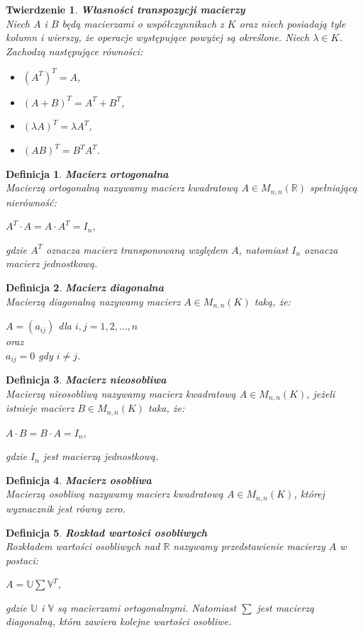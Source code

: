 \documentclass[12pt,a4paper]{report}
\newtheorem{df}{Definicja}
\newtheorem{tw}{Twierdzenie}
\begin{document}
\begin{tw}\textbf{Własności transpozycji macierzy}
\\Niech $A$ i $B$ będą macierzami o współczynnikach z $K$ oraz niech posiadają tyle kolumn i wierszy, że operacje występujące powyżej są określone. Niech $\lambda \in K$.
\\Zachodzą następujące równości:
\begin{itemize}
\item $(A^T)^T = A$,
\item $(A + B)^T = A^T + B^T$,
\item $(\lambda A)^T = \lambda A^T$,
\item $(AB)^T = B^T A^T$.
\end{itemize}
\end{tw}
\begin{df}\textbf{Macierz ortogonalna}
\\Macierzą ortogonalną nazywamy macierz kwadratową $A \in M_{n,n}(\mathbb{R})$ spełniającą nierówność:
\begin{center}
$A^T \cdot A = A\cdot A^T = I_n$,
\end{center}
gdzie $A^T$ oznacza macierz transponowaną względem $A$, natomiast $I_n$ oznacza macierz jednostkową.
\end{df}

\begin{df}\textbf{Macierz diagonalna}
\\Macierzą diagonalną nazywamy macierz $A\in M_{n,n}(K)$ taką, że:
\begin{center}
$A = (a_{ij})$ dla $i,j=1,2,...,n$ 
\\oraz 
\\$a_{ij} = 0$ gdy $i\neq j$.
\end{center}
\end{df}

\begin{df}\textbf{Macierz nieosobliwa}
\\Macierzą nieosobliwą nazywamy macierz kwadratową $A \in M_{n,n}(K)$, jeżeli istnieje macierz $B \in M_{n,n}(K)$ taka, że:
\begin{center}
$A \cdot B = B \cdot A = I_n$,
\end{center}
gdzie $I_n$ jest macierzą jednostkową.
\end{df}
\begin{df}\textbf{Macierz osobliwa}
\\Macierzą osobliwą nazywamy macierz kwadratową $A \in M_{n,n}(K)$, której wyznacznik jest równy zero.
\end{df}
\begin{df}\textbf{Rozkład wartości osobliwych}
\\Rozkładem wartości osobliwych nad $\mathbb{R}$ nazywamy przedstawienie macierzy $A$ w postaci:
\begin{center}
$A = \mathbb{U}\sum \mathbb{V}^T$,
\end{center}
gdzie $\mathbb{U}$ i $\mathbb{V}$ są macierzami ortogonalnymi. Natomiast $\sum$ jest macierzą diagonalną, która zawiera kolejne wartości osobliwe.
\end{df}
\end{document}
